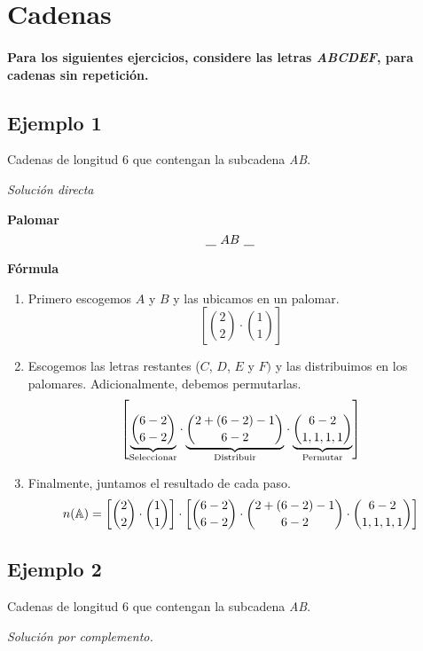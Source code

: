 \section{Cadenas}

\paragraph{Para los siguientes ejercicios, considere las letras \textit{ABCDEF}, para cadenas sin repetición.}

\subsection{Ejemplo 1}

Cadenas de longitud 6 que contengan la subcadena \textit{AB}.

\textit{Solución directa}

\textbf{Palomar}
\begin{equation*}
	~\underline{\hspace{0.3cm}}~ AB ~\underline{\hspace{0.3cm}}~
\end{equation*}

\textbf{Fórmula}

\begin{enumerate}
\item Primero escogemos $A$ y $B$ y las ubicamos en un palomar.
$$\left[\binom{2}{2}\cdot\binom{1}{1}\right]$$
\item Escogemos las letras restantes ($C$, $D$, $E$ y $F)$ y las distribuimos en los palomares. Adicionalmente, debemos permutarlas.
\begin{align*}
	\left[\underset{\text{Seleccionar}}{\underbrace{\binom{6-2}{6-2}}}\cdot\underset{\text{Distribuir}}{\underbrace{\binom{2+(6-2)-1}{6-2}}}\cdot\underset{\text{Permutar}}{\underbrace{\binom{6-2}{1,1,1,1}}}\right]
\end{align*}
\item Finalmente, juntamos el resultado de cada paso.
\begin{equation*}
n(\mathbb{A})=\left[\binom{2}{2}\cdot\binom{1}{1}\right]
\cdot
\left[\binom{6-2}{6-2}\cdot\binom{2+(6-2)-1}{6-2}\cdot\binom{6-2}{1,1,1,1}\right]
\end{equation*}
\end{enumerate}
\subsection{Ejemplo 2}

Cadenas de longitud 6 que contengan la subcadena \textit{AB}.

\textit{Solución por complemento.}

